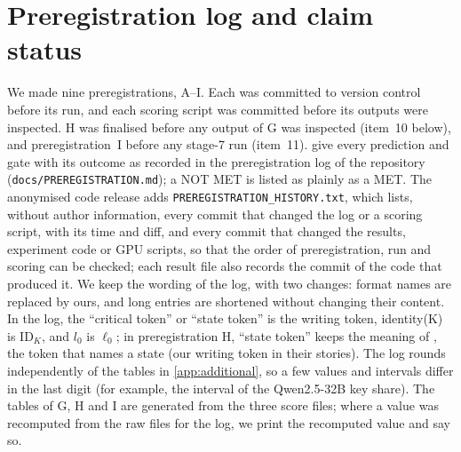 
\section{Preregistration log and claim status}\label{app:prereg}

We made nine preregistrations, A--I. Each was committed to version control before its run, and each scoring script was committed before its outputs were inspected. H was finalised before any output of G was inspected (item~10 below), and preregistration~I before any stage-7 run (item~11).  give every prediction and gate with its outcome as recorded in the preregistration log of the repository (\texttt{docs/PREREGISTRATION.md}); a NOT MET is listed as plainly as a MET. The anonymised code release adds \texttt{PREREGISTRATION\_HISTORY.txt}, which lists, without author information, every commit that changed the log or a scoring script, with its time and diff, and every commit that changed the results, experiment code or GPU scripts, so that the order of preregistration, run and scoring can be checked; each result file also records the commit of the code that produced it. We keep the wording of the log, with two changes: format names are replaced by ours, and long entries are shortened without changing their content. In the log, the ``critical token'' or ``state token'' is the writing token, identity(K) is $\mathrm{ID}_K$, and $l_0$ is $\ell_0$; in preregistration H, ``state token'' keeps the meaning of \citet{prakash2025lookbacks}, the token that names a state (our writing token in their stories). The log rounds independently of the tables in \cref{app:additional}, so a few values and intervals differ in the last digit (for example, the interval of the Qwen2.5-32B key share). The tables of G, H and I are generated from the three score files; where a value was recomputed from the raw files for the log, we print the recomputed value and say so.

